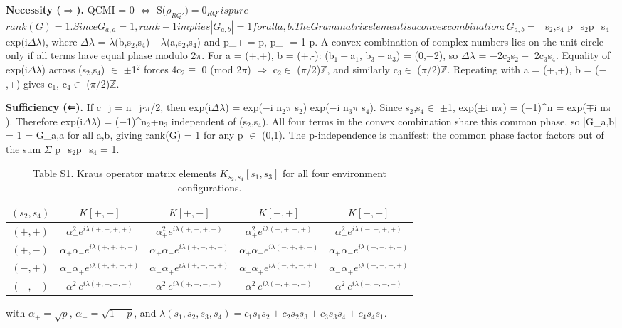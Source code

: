 \documentclass[aps,prl,showpacs]{revtex4-2}
\begin{document}
\textbf{Necessity ($\Rightarrow$).} QCMI = 0 $\Leftrightarrow$ S($\rho_{RQ'}) = 0 $\Leftrightarrow\rho$_{RQ'} is pure $\Leftrightarrow$ rank(G) = 1. Since G_{a,a} = 1, rank-1 implies |G_{a,b}| = 1 for all a,b. The Gram matrix element is a convex combination: G_{a,b} = $\Sigma_{s$_2$,s$_4$} p_{s$_2$}p_{s$_4$} exp(i$\Delta\lambda$), where $\Delta\lambda$ = $\lambda$(b,s$_2$,s$_4$) $-\lambda$(a,s$_2$,s$_4$) and p_+ = p, p_- = 1-p. A convex combination of complex numbers lies on the unit circle only if all terms have equal phase modulo 2$\pi$. For a = (+,+), b = (+,-): (b$_1-$a$_1$, b$_3-$a$_3$) = (0,$-$2), so $\Delta\lambda$ = $-$2c$_2$s$_2-$ 2c$_3$s$_4$. Equality of exp(i$\Delta\lambda$) across (s$_2$,s$_4$) $\in$ {$\pm$1}$^2$ forces 4c$_2\equiv$ 0 (mod 2$\pi$) $\Rightarrow$ c$_2\in$ ($\pi$/2)$\mathbb{Z}$, and similarly c$_3\in$ ($\pi$/2)$\mathbb{Z}$. Repeating with a = (+,+), b = ($-$,+) gives c$_1$, c$_4\in$ ($\pi$/2)$\mathbb{Z}$.

\textbf{Sufficiency (⇐).} If c_j = n_j$\cdot\pi$/2, then exp(i$\Delta\lambda$) = exp($-$i n$_2\pi$ s$_2$) exp($-$i n$_3\pi$ s$_4$). Since s$_2$,s$_4\in$ {$\pm$1}, exp($\pm$i n$\pi$) = ($-$1)^n = exp($\mp$i n$\pi$). Therefore exp(i$\Delta\lambda$) = ($-$1)^{n$_2$+n$_3$} independent of (s$_2$,s$_4$). All four terms in the convex combination share this common phase, so |G_{a,b}| = 1 = G_{a,a} for all a,b, giving rank(G) = 1 for any p $\in$ (0,1). The p-independence is manifest: the common phase factor factors out of the sum $\Sigma$ p_{s$_2$}p_{s$_4$} = 1.

\begin{table}[h]
\caption{Table S1. Kraus operator matrix elements $K_{s_2,s_4}[s_1,s_3]$ for all four environment configurations.}
\begin{tabular}{c|c|c|c|c}
\hline
$(s_2,s_4)$ & $K[+,+]$ & $K[+,-]$ & $K[-,+]$ & $K[-,-]$ \\
\hline
$(+,+)$ & $\alpha_+^2 e^{i\lambda(+,+,+,+)}$ & $\alpha_+^2 e^{i\lambda(+,-,+,+)}$ & $\alpha_+^2 e^{i\lambda(-,+,+,+)}$ & $\alpha_+^2 e^{i\lambda(-,-,+,+)}$ \\
$(+,-)$ & $\alpha_+\alpha_- e^{i\lambda(+,+,+,-)}$ & $\alpha_+\alpha_- e^{i\lambda(+,-,+,-)}$ & $\alpha_+\alpha_- e^{i\lambda(-,+,+,-)}$ & $\alpha_+\alpha_- e^{i\lambda(-,-,+,-)}$ \\
$(-,+)$ & $\alpha_-\alpha_+ e^{i\lambda(+,+,-,+)}$ & $\alpha_-\alpha_+ e^{i\lambda(+,-,-,+)}$ & $\alpha_-\alpha_+ e^{i\lambda(-,+,-,+)}$ & $\alpha_-\alpha_+ e^{i\lambda(-,-,-,+)}$ \\
$(-,-)$ & $\alpha_-^2 e^{i\lambda(+,+,-,-)}$ & $\alpha_-^2 e^{i\lambda(+,-,-,-)}$ & $\alpha_-^2 e^{i\lambda(-,+,-,-)}$ & $\alpha_-^2 e^{i\lambda(-,-,-,-)}$ \\
\hline
\end{tabular}
with $\alpha_+=\sqrt{p}$, $\alpha_-=\sqrt{1-p}$, and $\lambda(s_1,s_2,s_3,s_4)=c_1 s_1 s_2+c_2 s_2 s_3+c_3 s_3 s_4+c_4 s_4 s_1$.
\end{table}
\end{document}
